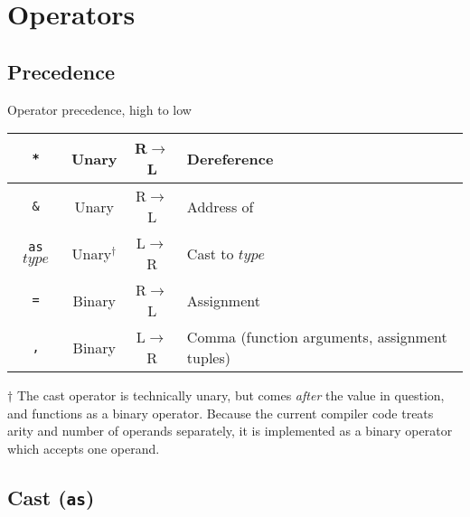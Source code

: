 \documentclass{article}
\begin{document}
\section{Operators}
\label{sec:operators}

\subsection{Precedence}
\label{sub:operators:precedence}
\begin{center}
  \begin{threeparttable}
    \caption{Operator precedence, high to low}
    \begin{tabular}{|c|c|c|l|}
      \hline
      \texttt{*} & Unary & R$\to$L & Dereference \\ \hline
      \texttt{\&} & Unary & R$\to$L & Address of \\ \hline
      \texttt{as} $type$ & Unary$^\dagger$ & L$\to$R & Cast to $type$ \\ \hline
      \texttt{=} & Binary & R$\to$L & Assignment \\ \hline
      \texttt{,} & Binary & L$\to$R & Comma (function arguments, assignment tuples) \\ \hline
    \end{tabular}
    \begin{tablenotes}
      \item{$\dagger$ \small{The cast operator is technically unary, but comes
          \emph{after}
          the value in question, and functions as a binary operator. Because the current
          compiler code treats arity and number of operands separately, it is implemented
          as a binary operator which accepts one operand.}}
    \end{tablenotes}
  \end{threeparttable}
\end{center}

\subsection{Cast (\texttt{as})}
\label{sub:operators:cast}

\end{document}
